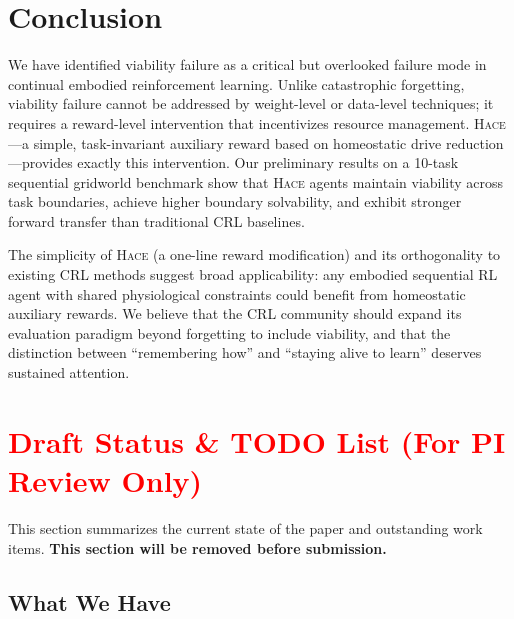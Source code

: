 \documentclass{article}
\newcommand{\hace}{\textsc{Hace}}
\begin{document}
\section{Conclusion}
\label{sec:conclusion}

We have identified viability failure as a critical but overlooked failure
mode in continual embodied reinforcement learning. Unlike catastrophic
forgetting, viability failure cannot be addressed by weight-level or
data-level techniques; it requires a reward-level intervention that
incentivizes resource management. \hace{}---a simple, task-invariant
auxiliary reward based on homeostatic drive reduction---provides exactly
this intervention. Our preliminary results on a 10-task sequential
gridworld benchmark show that \hace{} agents maintain viability across
task boundaries, achieve higher boundary solvability, and exhibit
stronger forward transfer than traditional CRL baselines.

The simplicity of \hace{} (a one-line reward modification) and its
orthogonality to existing CRL methods suggest broad applicability:
any embodied sequential RL agent with shared physiological constraints
could benefit from homeostatic auxiliary rewards. We believe that the
CRL community should expand its evaluation paradigm beyond forgetting
to include viability, and that the distinction between ``remembering
how'' and ``staying alive to learn'' deserves sustained attention.


\newpage
\appendix
\section*{\textcolor{red}{Draft Status \& TODO List (For PI Review Only)}}

This section summarizes the current state of the paper and outstanding
work items. \textbf{This section will be removed before submission.}

\subsection*{What We Have}
\end{document}
